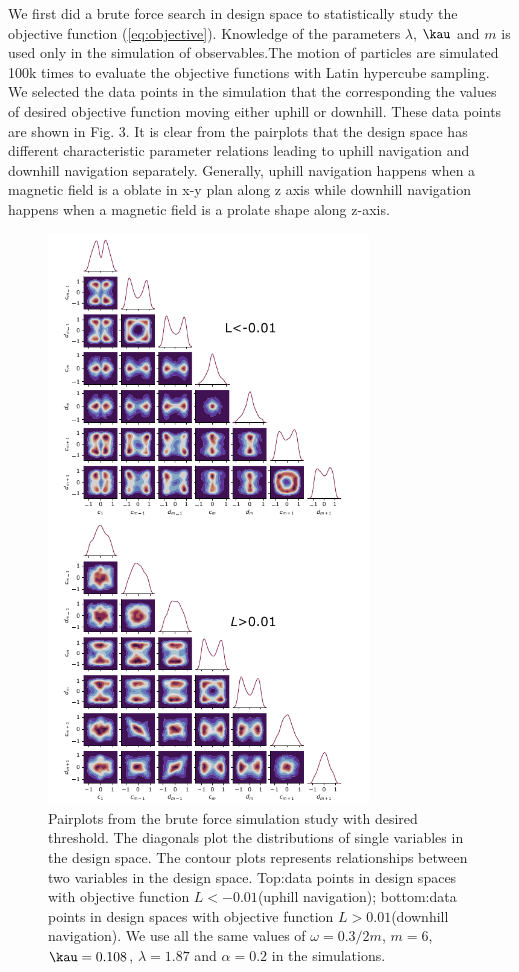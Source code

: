 We first did a brute force search in design space to statistically study the 
objective function (\ref{eq:objective}). Knowledge of the parameters $\lambda$, $\kau$ and $m$ is used only in the simulation of observables.The  motion of particles are simulated 100k times to evaluate the objective functions with Latin hypercube sampling. We selected the data points in the simulation that the corresponding the values of desired objective function moving either uphill or downhill. These data points are shown in Fig. 3. It is clear from the pairplots that the design space has different characteristic parameter relations leading to uphill navigation and downhill navigation separately. Generally, uphill navigation happens when a magnetic field is  a oblate in x-y plan along z axis while downhill navigation happens when a magnetic field is a prolate shape along z-axis.
\begin{figure}[h!]
    \centering
    \includegraphics[width=8.5cm]{figures/pairplot.pdf}
    \caption{Pairplots from the brute force simulation study with desired threshold. The diagonals plot the distributions of single variables in the design space.  The contour plots represents  relationships between two variables in the design space. 
    Top:data points in design spaces with objective function $L<-0.01$(uphill navigation); bottom:data points in design spaces with objective function $L>0.01$(downhill navigation). We use all the same values of  $\omega=0.3/2 m$, $m=6$, $\kau=0.108$, $\lambda=1.87$ and $\alpha=0.2$  in the simulations.}
    \label{fig:pairplot}
\end{figure}

